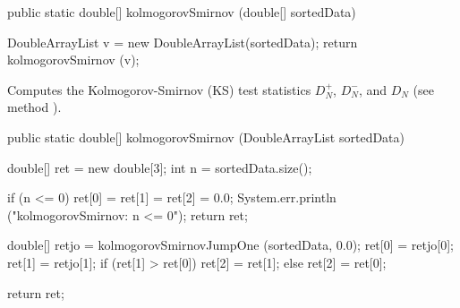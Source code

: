 \begin{htmlonly}
\end{htmlonly}
\begin{code}


   public static double[] kolmogorovSmirnov (double[] sortedData)\begin{hide} {
      DoubleArrayList v = new DoubleArrayList(sortedData);
      return kolmogorovSmirnov (v);
   }\end{hide}
\end{code}
\begin{tabb} Computes the Kolmogorov-Smirnov (KS) test statistics
 $D_N^+$, $D_N^-$, and $D_N$ (see method
 ).
\end{tabb}
\begin{htmlonly}
\end{htmlonly}
\begin{code}

   public static double[] kolmogorovSmirnov (DoubleArrayList sortedData)\begin{hide} {
      double[] ret = new double[3];
      int n = sortedData.size();

      if (n <= 0) {
         ret[0] = ret[1] = ret[2] = 0.0;
         System.err.println ("kolmogorovSmirnov:   n <= 0");
         return ret;
      }

      double[] retjo = kolmogorovSmirnovJumpOne (sortedData, 0.0);
      ret[0] = retjo[0];
      ret[1] = retjo[1];
      if (ret[1] > ret[0])
         ret[2] = ret[1];
      else
         ret[2] = ret[0];

      return ret;
   }\end{hide}
\end{code}
